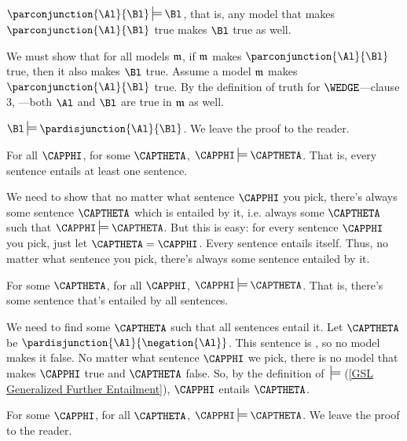 \begin{majorILnc}{}
$\parconjunction{\Al}{\Bl}\sdtstile{}{}\Bl$, that is, any model that makes $\parconjunction{\Al}{\Bl}$ true makes $\Bl$ true as well. 
\end{majorILnc}
\begin{PROOF}
We must show that for all models $\mathfrak{m}$, if $\mathfrak{m}$ makes $\parconjunction{\Al}{\Bl}$ true, then it also makes $\Bl$ true. 
Assume a model $\mathfrak{m}$ makes $\parconjunction{\Al}{\Bl}$ true. 
By the definition of truth for $\WEDGE$---clause 3, ---both $\Al$ and $\Bl$ are true in $\mathfrak{m}$ as well. 
\end{PROOF}
\begin{majorILnc}{}
$\Bl\sdtstile{}{}\pardisjunction{\Al}{\Bl}$. We leave the proof to the reader.
\end{majorILnc}
\begin{majorILnc}{}
For all $\CAPPHI$, for some $\CAPTHETA$, $\CAPPHI\sdtstile{}{}\CAPTHETA$. That is, every \GSL{} sentence entails at least one \GSL{} sentence.
\end{majorILnc}
\begin{PROOF}
We need to show that no matter what \GSL{} sentence $\CAPPHI$ you pick, there's always some \GSL{} sentence $\CAPTHETA$ which is entailed by it, i.e. always some $\CAPTHETA$ such that $\CAPPHI\sdtstile{}{}\CAPTHETA$. 
But this is easy: for every \GSL{} sentence $\CAPPHI$ you pick, just let $\CAPTHETA=\CAPPHI$. 
Every \GSL{} sentence entails itself.  Thus, no matter what \GSL{} sentence you pick, there's always some sentence entailed by it. 
\end{PROOF}
\begin{majorILnc}{}
For some $\CAPTHETA$, for all $\CAPPHI$, $\CAPPHI\sdtstile{}{}\CAPTHETA$. That is, there's some \GSL{} sentence that's entailed by all \GSL{} sentences.
\end{majorILnc}
\begin{PROOF}
We need to find some $\CAPTHETA$ such that all \GSL{} sentences entail it. 
Let $\CAPTHETA$ be $\pardisjunction{\Al}{\negation{\Al}}$. 
This sentence is , so no model makes it false. 
No matter what sentence $\CAPPHI$ we pick, there is no model that makes $\CAPPHI$ true and $\CAPTHETA$ false. 
So, by the definition of $\:\sdtstile{}{}$ (\ref{GSL Generalized Further Entailment}), $\CAPPHI$ entails $\CAPTHETA$.
\end{PROOF}
\begin{majorILnc}{}
For some $\CAPPHI$, for all $\CAPTHETA$, $\CAPPHI\sdtstile{}{}\CAPTHETA$. We leave the proof to the reader.
\end{majorILnc}

